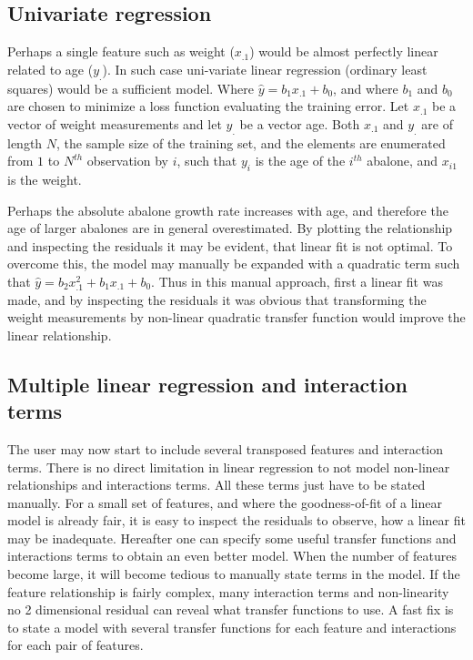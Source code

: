 \subsection{Univariate regression}
Perhaps a single feature such as weight ($x_{.1}$) would be almost perfectly linear related to age ($y_.$). In such case uni-variate linear regression (ordinary least squares) would be a sufficient model. Where $\hat{y} = b_1 x_{.1} + b_0$, and where $b_1$ and $b_0$ are chosen to minimize a loss function evaluating the training error. Let $x_{.1}$ be a vector of weight measurements and let $y_.$ be a vector age. Both $x_.1$ and $y_.$ are of length $N$, the sample size of the training set, and the elements are enumerated from $1$ to $N^{th}$ observation by $i$, such that $y_i$ is the age of the $i^{th}$ abalone, and $x_{i1}$ is the weight.

Perhaps the absolute abalone growth rate increases with age, and therefore the age of larger abalones are in general overestimated. By plotting the relationship and inspecting the residuals it may be evident, that linear fit is not optimal. To overcome this, the model may manually be expanded with a quadratic term such that $\hat{y} = b_2 x_{.1}^2 + b_1 x_{.1} + b_0$.  Thus in this manual approach, first a linear fit was made, and by inspecting the residuals it was obvious that transforming the weight measurements by non-linear quadratic transfer function would improve the linear relationship.

\subsection{Multiple linear regression and interaction terms}
The user may now start to include several transposed features and interaction terms. There is no direct limitation in linear regression to not model non-linear relationships and interactions terms. All these terms just have to be stated manually. For a small set of features, and where the goodness-of-fit of a linear model is already fair, it is easy to inspect the residuals to observe, how a linear fit may be inadequate. Hereafter one can specify some useful transfer functions and interactions terms to obtain an even better model. When the number of features become large, it will become tedious to manually state terms in the model. If the feature relationship is fairly complex, many interaction terms and non-linearity no 2 dimensional residual can reveal what transfer functions to use. A fast fix is to state a model with several transfer functions for each feature and interactions for each pair of features.

